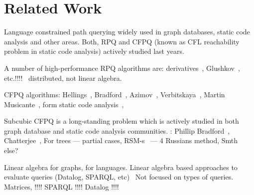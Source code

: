\section{Related Work}

Language constrained path querying widely used in graph databases, static code analysis and other areas.
Both, RPQ and CFPQ (known as CFL reachability problem in static code analysis) actively studied last years.

A number of high-performance RPQ algorithms are: derivatives~\cite{10.1145/2949689.2949711}, Glushkov~\cite{Wang2019}, etc.!!!!~\cite{!!!} distributed, not linear algebra.

CFPQ algorithms: Hellings~\cite{hellingsRelational}, Bradford~\cite{8249039}, Azimov~\cite{Azimov:2018:CPQ:3210259.3210264}, Verbitskaya~\cite{10.1007/978-3-319-41579-6_22}, Martin Musicante~\cite{10.1007/978-3-319-91662-0_17,Medeiros:2018:EEC:3167132.3167265}, form static code analysis~\cite{!!!}, 

Subcubic CFPQ is a long-standing problem which is actively studied in both graph database and static code analysis communities. : Phillip Bradford~\cite{Bradford2017EfficientEP}, Chatterjee~\cite{10.1145/3158118}, For trees --- partial cases, RSM-s~\cite{rsm:analysis:10.1007/3-540-44585-4_18} --- 4 Russians method, Smth else?~\cite{zhang2020conditional,pavlogiannis2020finegrained}

Linear algebra for graphs, for languages. 
Linear algebra based approaches to evaluate queries (Datalog, SPARQL, etc)~\cite{!!!} Not focused on types of queries.
Matrices, !!!!
SPARQL !!!!
Datalog !!!!	